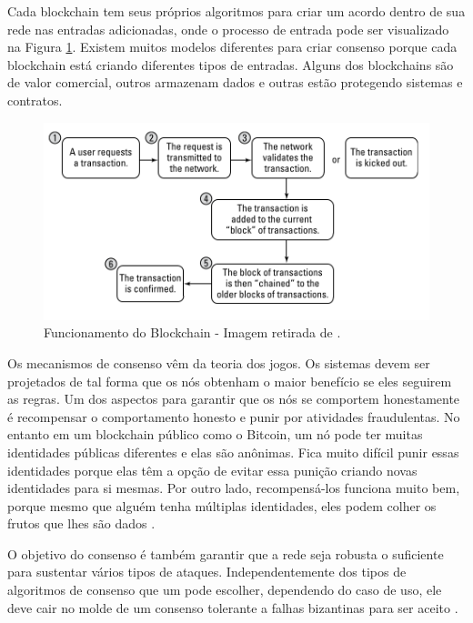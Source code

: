        Cada blockchain tem seus próprios algoritmos para criar um acordo dentro de sua rede nas entradas adicionadas, onde o processo de entrada pode ser visualizado na Figura \ref{fig:blockchain_work_dummies}. Existem muitos modelos diferentes para criar consenso porque cada blockchain está criando diferentes tipos de entradas. Alguns dos blockchains são de valor comercial, outros armazenam dados e outras estão protegendo sistemas e contratos.\cite{blockchain_for_dummies}
        
        
                \begin{figure}[H]
                     \centering
                     \includegraphics[scale=0.7]{figuras/capitulo_2/blockchain_come_to_agreement.png}
                     \caption{Funcionamento do Blockchain - Imagem retirada de \cite{blockchain_for_dummies}.}
                     \label{fig:blockchain_work_dummies}
                \end{figure}
        
        Os mecanismos de consenso vêm da teoria dos jogos. Os sistemas devem ser projetados de tal forma que os nós obtenham o maior benefício se eles seguirem as regras. Um dos aspectos para garantir que os nós se comportem honestamente é recompensar o comportamento honesto e punir por atividades fraudulentas. No entanto em um blockchain público como o Bitcoin, um nó pode ter muitas identidades públicas diferentes e elas são anônimas. Fica muito difícil punir essas identidades porque elas têm a opção de evitar essa punição criando novas identidades para si mesmas. Por outro lado, recompensá-los funciona muito bem, porque mesmo que alguém tenha múltiplas identidades, eles podem colher os frutos que lhes são dados \cite{beginnig_blockchain_bikramaditya}.
        
        O objetivo do consenso é também garantir que a rede seja robusta o suficiente para sustentar vários tipos de ataques. Independentemente dos tipos de algoritmos de consenso que um pode escolher, dependendo do caso de uso, ele deve cair no molde de um consenso tolerante a falhas bizantinas para ser aceito \cite{beginnig_blockchain_bikramaditya}.
        
